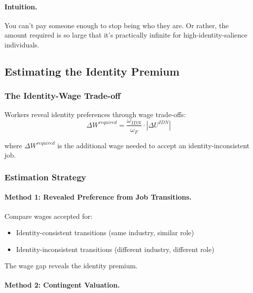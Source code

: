 \paragraph{Intuition.}
You can't pay someone enough to stop being who they are. Or rather, 
the amount required is so large that it's practically infinite for 
high-identity-salience individuals.

\subsection{Estimating the Identity Premium}

\subsubsection{The Identity-Wage Trade-off}

Workers reveal identity preferences through wage trade-offs:
\begin{equation}
\Delta W^{required} = \frac{\omega_{IDN}}{\omega_F} \cdot |\Delta U^{IDN}|
\label{eq:wage-premium}
\end{equation}

where $\Delta W^{required}$ is the additional wage needed to accept 
an identity-inconsistent job.

\subsubsection{Estimation Strategy}

\paragraph{Method 1: Revealed Preference from Job Transitions.}

Compare wages accepted for:
\begin{itemize}
    \item Identity-consistent transitions (same industry, similar role)
    \item Identity-inconsistent transitions (different industry, different role)
\end{itemize}

The wage gap reveals the identity premium.

\paragraph{Method 2: Contingent Valuation.}

